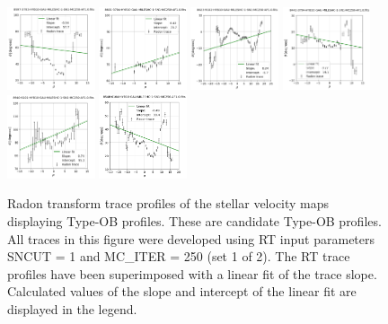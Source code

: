 \documentclass[fleqn,usenatbib]{mnras}
\begin{document}
\begin{figure}
    \centering
    \includegraphics[width=0.23\textwidth]{Images/LINFITS/CPSB-8997-3703-LINFIT-EBARS-MASKED.png}
    \includegraphics[width=0.23\textwidth]{Images/LINFITS/CC1-8601-3704-LINFIT-EBARS-MASKED.png}
    \includegraphics[width=0.23\textwidth]{Images/LINFITS/CPSB-8623-9102-LINFIT-EBARS-MASKED.png}
    \includegraphics[width=0.23\textwidth]{Images/LINFITS/CC0-8442-3704-LINFIT-EBARS-MASKED.png}
    \includegraphics[width=0.23\textwidth]{Images/LINFITS/CC0-8940-6101-LINFIT-EBARS-MASKED.png}
    \includegraphics[width=0.23\textwidth]{Images/LINFITS/CC1-8548-6104-LINFIT-EBARS-MASKED.png}
    \caption{Radon transform trace profiles of the stellar velocity maps displaying Type-OB profiles. These are candidate Type-OB profiles. 
    All traces in this figure were developed using RT input parameters SNCUT = 1 and MC\_ITER = 250 (set 1 of 2). The RT trace profiles have been superimposed with a linear fit of the trace slope. Calculated values of the slope and intercept of the linear fit are displayed in the legend.}
    \label{fig:Radon-traces-Candidate-TYPE-OB-LINFITS}
\end{figure}
\end{document}
